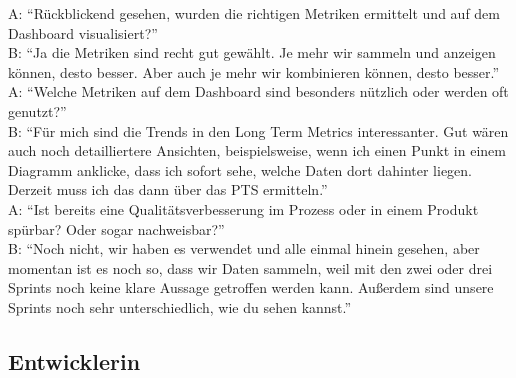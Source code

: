 A\@: ``Rückblickend gesehen, wurden die richtigen Metriken ermittelt und auf dem Dashboard visualisiert?'' \\
B\@: ``Ja die Metriken sind recht gut gewählt. Je mehr wir sammeln und anzeigen können, desto besser. Aber auch je mehr wir kombinieren können, desto besser.'' \\
A\@: ``Welche Metriken auf dem Dashboard sind besonders nützlich oder werden oft genutzt?'' \\
B\@: ``Für mich sind die Trends in den Long Term Metrics interessanter. Gut wären auch noch detailliertere Ansichten, beispielsweise, wenn ich einen Punkt in einem Diagramm anklicke, dass ich sofort sehe, welche Daten dort dahinter liegen. Derzeit muss ich das dann über das \ac{PTS} ermitteln.'' \\
A\@: ``Ist bereits eine Qualitätsverbesserung im Prozess oder in einem Produkt spürbar? Oder sogar nachweisbar?'' \\
B\@: ``Noch nicht, wir haben es verwendet und alle einmal hinein gesehen, aber momentan ist es noch so, dass wir Daten sammeln, weil mit den zwei oder drei Sprints noch keine klare Aussage getroffen werden kann. Außerdem sind unsere Sprints noch sehr unterschiedlich, wie du sehen kannst.''

\subsection{Entwicklerin}

